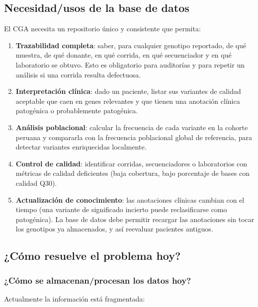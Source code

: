 \documentclass[11pt,a4paper]{article}
\begin{document}
\subsection{Necesidad/usos de la base de datos}

El CGA necesita un repositorio único y consistente que permita:

\begin{enumerate}
  \item \textbf{Trazabilidad completa}: saber, para cualquier genotipo reportado, de qué muestra, de qué donante, en qué corrida, en qué secuenciador y en qué laboratorio se obtuvo. Esto es obligatorio para auditorías y para repetir un análisis si una corrida resulta defectuosa.
  \item \textbf{Interpretación clínica}: dado un paciente, listar sus variantes de calidad aceptable que caen en genes relevantes y que tienen una anotación clínica patogénica o probablemente patogénica.
  \item \textbf{Análisis poblacional}: calcular la frecuencia de cada variante en la cohorte peruana y compararla con la frecuencia poblacional global de referencia, para detectar variantes enriquecidas localmente.
  \item \textbf{Control de calidad}: identificar corridas, secuenciadores o laboratorios con métricas de calidad deficientes (baja cobertura, bajo porcentaje de bases con calidad Q30).
  \item \textbf{Actualización de conocimiento}: las anotaciones clínicas cambian con el tiempo (una variante de significado incierto puede reclasificarse como patogénica). La base de datos debe permitir recargar las anotaciones sin tocar los genotipos ya almacenados, y así reevaluar pacientes antiguos.
\end{enumerate}

\subsection{¿Cómo resuelve el problema hoy?}

\subsubsection{¿Cómo se almacenan/procesan los datos hoy?}

Actualmente la información está fragmentada:
\end{document}
